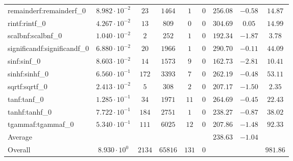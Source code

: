 \begin{tabular}{|l|c|c|c|c|c|c|c|c|}
remainderf:remainderf\_0     & $ 8.982 \cdot 10^{-2} $ & $ 23     $ & $ 1464  $ & $ 1   $ & $ 0   $ & $ 256.08      $ & $ -0.58   $ & $ 14.87   $ \\
rintf:rintf\_0               & $ 4.267 \cdot 10^{-2} $ & $ 13     $ & $ 809   $ & $ 0   $ & $ 0   $ & $ 304.69      $ & $ 0.05    $ & $ 14.99   $ \\
scalbnf:scalbnf\_0           & $ 1.040 \cdot 10^{-2} $ & $ 2      $ & $ 252   $ & $ 1   $ & $ 0   $ & $ 192.34      $ & $ -1.87   $ & $ 3.78    $ \\
significandf:significandf\_0 & $ 6.880 \cdot 10^{-2} $ & $ 20     $ & $ 1966  $ & $ 1   $ & $ 0   $ & $ 290.70      $ & $ -0.11   $ & $ 44.09   $ \\
sinf:sinf\_0                 & $ 8.603 \cdot 10^{-2} $ & $ 14     $ & $ 1573  $ & $ 9   $ & $ 0   $ & $ 162.73      $ & $ -2.81   $ & $ 10.41   $ \\
sinhf:sinhf\_0               & $ 6.560 \cdot 10^{-1} $ & $ 172    $ & $ 3393  $ & $ 7   $ & $ 0   $ & $ 262.19      $ & $ -0.48   $ & $ 53.11   $ \\
sqrtf:sqrtf\_0               & $ 2.413 \cdot 10^{-2} $ & $ 5      $ & $ 308   $ & $ 2   $ & $ 0   $ & $ 207.17      $ & $ -1.50   $ & $ 2.35    $ \\
tanf:tanf\_0                 & $ 1.285 \cdot 10^{-1} $ & $ 34     $ & $ 1971  $ & $ 11  $ & $ 0   $ & $ 264.69      $ & $ -0.45   $ & $ 22.43   $ \\
tanhf:tanhf\_0               & $ 7.722 \cdot 10^{-1} $ & $ 184    $ & $ 2751  $ & $ 1   $ & $ 0   $ & $ 238.27      $ & $ -0.87   $ & $ 38.02   $ \\
tgammaf:tgammaf\_0           & $ 5.340 \cdot 10^{-1} $ & $ 111    $ & $ 6025  $ & $ 12  $ & $ 0   $ & $ 207.86      $ & $ -1.48   $ & $ 92.33   $ \\
\hline
Average                      & $                     $ & $        $ & $       $ & $     $ & $     $ & $ 238.63      $ & $ -1.04   $ & $         $ \\
\hline
Overall                      & $ 8.930 \cdot 10^{0}  $ & $ 2134   $ & $ 65816 $ & $ 131 $ & $ 0   $ & $             $ & $         $ & $ 981.86  $ \\
\hline
\end{tabular}

